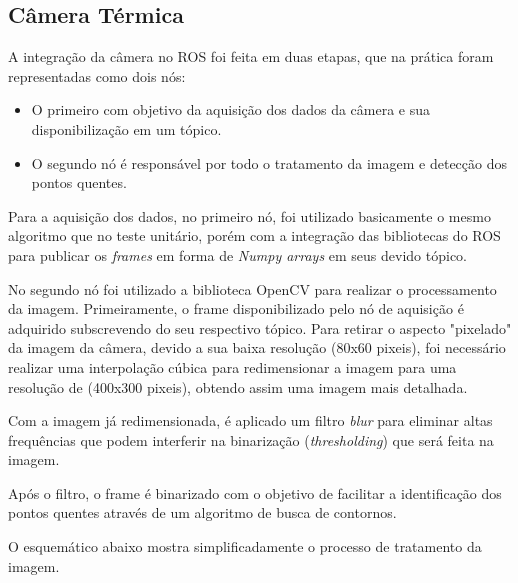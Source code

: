      \subsection{Câmera Térmica}
     
     A integração da câmera no ROS foi feita em duas etapas, que na prática foram representadas como dois nós:
     
     \begin{itemize}
         \item O primeiro com objetivo da aquisição dos dados da câmera e sua disponibilização em um tópico.
         \item O segundo nó é responsável por todo o tratamento da imagem e detecção dos pontos quentes.
     \end{itemize}
     
     Para a aquisição dos dados, no primeiro nó, foi utilizado basicamente o mesmo algoritmo que no teste unitário, porém com a integração das bibliotecas do ROS para publicar os \textit{frames} em forma de \textit{Numpy arrays} em seus devido tópico.
     
     No segundo nó foi utilizado a biblioteca OpenCV para realizar o processamento da imagem. Primeiramente, o frame disponibilizado pelo nó de aquisição é adquirido subscrevendo do seu respectivo tópico. Para retirar o aspecto "pixelado" da imagem da câmera, devido a sua baixa resolução (80x60 pixeis), foi necessário realizar uma interpolação cúbica para redimensionar a imagem para uma resolução de (400x300 pixeis), obtendo assim uma imagem mais detalhada. 
     
     Com a imagem já redimensionada, é aplicado um filtro \textit{blur} para eliminar altas frequências que podem interferir na binarização (\textit{thresholding}) que será feita na imagem.
     
     Após o filtro, o frame é binarizado com o objetivo de facilitar a identificação dos pontos quentes através de um algoritmo de busca de contornos.
     
     O esquemático abaixo mostra simplificadamente o processo de tratamento da imagem.
     
